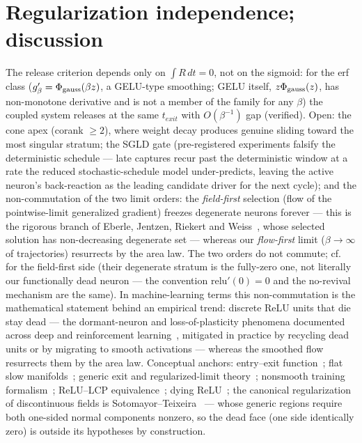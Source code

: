 \documentclass[11pt]{article}
\begin{document}
\section{Regularization independence; discussion}\label{sec:reg}
The release criterion depends only on $\int R\,dt=0$, not on the sigmoid: for
the erf class ($g_\beta'=\Phi_{\rm gauss}(\beta z)$, a GELU-type smoothing;
GELU itself, $z\Phi_{\rm gauss}(z)$, has non-monotone derivative and is not a
member of the family for any $\beta$) the coupled system releases at the same $t_{exit}$ with
$O(\beta^{-1})$ gap (verified). Open: the cone apex (corank $\ge2$), where
weight decay produces genuine sliding toward the most singular stratum; the
SGLD gate (pre-registered experiments falsify the deterministic schedule ---
late captures recur past the deterministic window at a rate the reduced
stochastic-schedule model under-predicts, leaving the active neuron's
back-reaction as the leading candidate driver for the next cycle); and the
non-commutation of the two limit orders: the \emph{field-first}
selection (flow of the pointwise-limit generalized gradient) freezes degenerate
neurons forever --- this is the rigorous branch of Eberle, Jentzen, Riekert and
Weiss~\cite{EJRW23}, whose selected solution has non-decreasing degenerate set
--- whereas our \emph{flow-first} limit ($\beta\to\infty$ of trajectories)
resurrects by the area law. The two orders do not commute; cf.~\cite{EJRW23}
for the field-first side (their degenerate stratum is the fully-zero one, not
literally our functionally dead neuron --- the convention $\mathrm{relu}'(0)=0$
and the no-revival mechanism are the same). In machine-learning terms this
non-commutation is the mathematical statement behind an empirical trend:
discrete ReLU units that die stay dead --- the dormant-neuron and
loss-of-plasticity phenomena documented across deep and reinforcement
learning~\cite{Sokar23,Lyle23,Dohare24}, mitigated in practice by recycling
dead units or by migrating to smooth activations --- whereas the smoothed flow
resurrects them by the area law. Conceptual anchors: entry--exit
function~\cite{DMS16,SDR23}; flat slow manifolds~\cite{Kri17}; generic exit
and regularized-limit theory~\cite{Jef16,GH}; nonsmooth training
formalism~\cite{BP21}; ReLU--LCP equivalence~\cite{APM20}; dying
ReLU~\cite{Lu19}; the canonical regularization of discontinuous fields is
Sotomayor--Teixeira~\cite{ST98,LST07} --- whose generic regions require both
one-sided normal components nonzero, so the dead face (one side identically
zero) is outside its hypotheses by construction.
\end{document}
